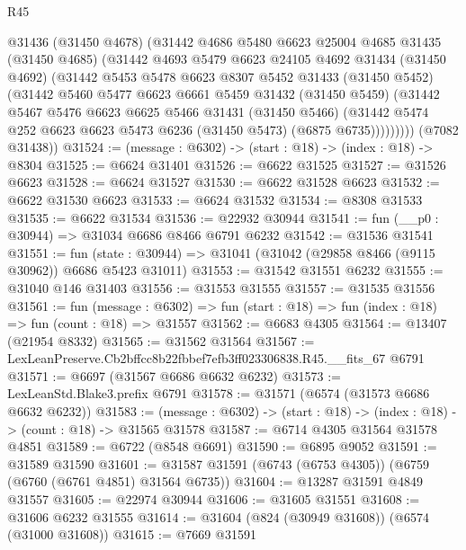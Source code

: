 \begin{lexlean}{R45}
\begin{coremodule}
{          @31436
          (@31450 @4678)
          (@31442
            @4686
            @5480
            @6623
            @25004
            @4685
            @31435
            (@31450 @4685)
            (@31442
              @4693
              @5479
              @6623
              @24105
              @4692
              @31434
              (@31450 @4692)
              (@31442
                @5453
                @5478
                @6623
                @8307
                @5452
                @31433
                (@31450 @5452)
                (@31442
                  @5460
                  @5477
                  @6623
                  @6661
                  @5459
                  @31432
                  (@31450 @5459)
                  (@31442
                    @5467
                    @5476
                    @6623
                    @6625
                    @5466
                    @31431
                    (@31450 @5466)
                    (@31442 @5474 @252 @6623 @6623 @5473 @6236 (@31450 @5473) (@6875 @6735)))))))))
      (@7082 @31438))
@31524 := (message : @6302) -> (start : @18) -> (index : @18) -> @8304
@31525 := @6624 @31401
@31526 := @6622 @31525
@31527 := @31526 @6623
@31528 := @6624 @31527
@31530 := @6622 @31528 @6623
@31532 := @6622 @31530 @6623
@31533 := @6624 @31532
@31534 := @8308 @31533
@31535 := @6622 @31534
@31536 := @22932 @30944
@31541 := fun (__p0 : @30944) => @31034 @6686 @8466 @6791 @6232
@31542 := @31536 @31541
@31551 := fun (state : @30944) => @31041 (@31042 (@29858 @8466 (@9115 @30962)) @6686 @5423 @31011)
@31553 := @31542 @31551 @6232
@31555 := @31040 @146 @31403
@31556 := @31553 @31555
@31557 := @31535 @31556
@31561 := fun (message : @6302) =>
  fun (start : @18) => fun (index : @18) => fun (count : @18) => @31557
@31562 := @6683 @4305
@31564 := @13407 (@21954 @8332)
@31565 := @31562 @31564
@31567 := LexLeanPreserve.Cb2bffcc8b22fbbef7efb3ff023306838.R45.__fits_67 @6791
@31571 := @6697 (@31567 @6686 @6632 @6232)
@31573 := LexLeanStd.Blake3.prefix @6791
@31578 := @31571 (@6574 (@31573 @6686 @6632 @6232))
@31583 := (message : @6302) -> (start : @18) -> (index : @18) -> (count : @18) -> @31565 @31578
@31587 := @6714 @4305 @31564 @31578 @4851
@31589 := @6722 (@8548 @6691)
@31590 := @6895 @9052
@31591 := @31589 @31590
@31601 := @31587 @31591 (@6743 (@6753 @4305)) (@6759 (@6760 (@6761 @4851) @31564 @6735))
@31604 := @13287 @31591 @4849 @31557
@31605 := @22974 @30944
@31606 := @31605 @31551
@31608 := @31606 @6232 @31555
@31614 := @31604 (@824 (@30949 @31608)) (@6574 (@31000 @31608))
@31615 := @7669 @31591
}
\end{coremodule}
\end{lexlean}
